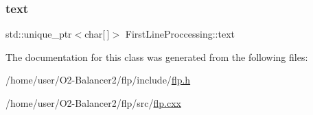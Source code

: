 \subsubsection{\texorpdfstring{text}{text}}
{\footnotesize\ttfamily std\+::unique\+\_\+ptr$<$char\mbox{[}$\,$\mbox{]}$>$ First\+Line\+Proccessing\+::text\hspace{0.3cm}{\ttfamily [protected]}}



The documentation for this class was generated from the following files\+:\begin{DoxyCompactItemize}
\item 
/home/user/\+O2-\/\+Balancer2/flp/include/\hyperlink{flp_8h}{flp.\+h}\item 
/home/user/\+O2-\/\+Balancer2/flp/src/\hyperlink{flp_8cxx}{flp.\+cxx}\end{DoxyCompactItemize}
